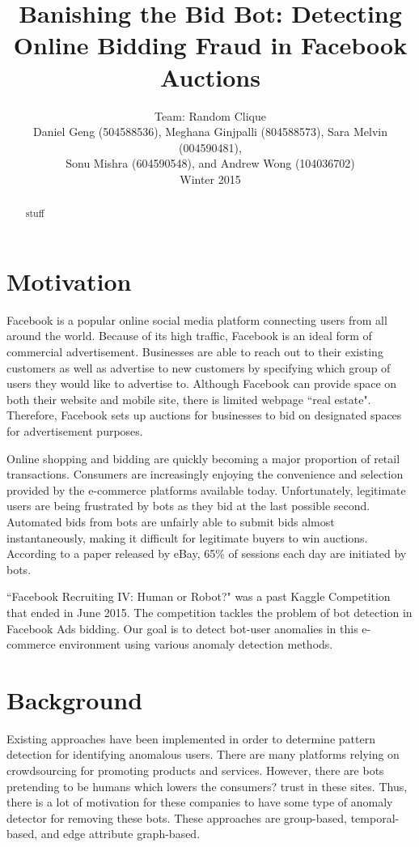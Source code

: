 \documentclass{article} %
\title{Banishing the Bid Bot: Detecting Online Bidding Fraud in Facebook Auctions}
\author{
Team: Random Clique \\
Daniel Geng (504588536), Meghana Ginjpalli (804588573), Sara Melvin (004590481), \\
Sonu Mishra (604590548), and Andrew Wong (104036702) \\
Winter 2015
}
\begin{document}
\maketitle

\begin{abstract}

stuff

\end{abstract}

\section{Motivation}

Facebook is a popular online social media platform connecting users from all around the world.
Because of its high traffic, Facebook is an ideal form of commercial advertisement.
Businesses are able to reach out to their existing customers as well as advertise to new customers by specifying which group of users they would like to advertise to.
Although Facebook can provide space on both their website and mobile site, there is limited webpage ``real estate".
Therefore, Facebook sets up auctions for businesses to bid on designated spaces for advertisement purposes.

Online shopping and bidding are quickly becoming a major proportion of retail transactions. \cite{shopping}
Consumers are increasingly enjoying the convenience and selection provided by the e-commerce platforms available today.
Unfortunately, legitimate users are being frustrated by bots as they bid at the last possible second.
Automated bids from bots are unfairly able to submit bids almost instantaneously, making it difficult for legitimate buyers to win auctions.
According to a paper released by eBay, 65\% of sessions each day are initiated by bots. \cite{ebay}

``Facebook Recruiting IV: Human or Robot?" was a past Kaggle Competition that ended in June 2015.
The competition tackles the problem of bot detection in Facebook Ads bidding.
Our goal is to detect bot-user anomalies in this e-commerce environment using various anomaly detection methods.

\section{Background}

Existing approaches have been implemented in order to determine pattern detection for identifying anomalous users.
There are many platforms relying on crowdsourcing for promoting products and services.
However, there are bots pretending to be humans which lowers the consumers? trust in these sites.
Thus, there is a lot of motivation for these companies to have some type of anomaly detector for removing these bots.
These approaches are group-based, temporal-based, and edge attribute graph-based.
\end{document}
